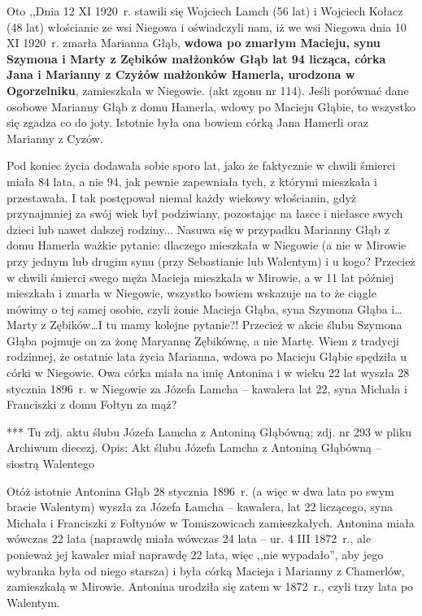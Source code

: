 Oto ,,Dnia 12 XI 1920~r. stawili się Wojciech Lamch (56 lat) i Wojciech Kołacz (48 lat) włościanie ze wsi Niegowa i oświadczyli nam, iż we wsi Niegowa dnia 10 XI 1920~r. zmarła Marianna Głąb, \textbf{wdowa po zmarłym Macieju, synu Szymona i Marty z Zębików małżonków Głąb lat 94 licząca, córka Jana i Marianny z Czyżów małżonków Hamerla, urodzona w Ogorzelniku}, zamieszkała w Niegowie. (akt zgonu nr 114). Jeśli porównać dane osobowe Marianny Głąb z domu Hamerla, wdowy po Macieju Głąbie, to wszystko się zgadza co do joty. Istotnie była ona bowiem córką Jana Hamerli oraz Marianny z Cyzów.

Pod koniec życia dodawała sobie sporo lat, jako że faktycznie w chwili śmierci miała 84 lata, a nie 94, jak pewnie zapewniała tych, z którymi mieszkała i przestawała. I tak postępował niemal każdy wiekowy włościanin, gdyż przynajmniej za swój wiek był podziwiany, pozostając na łasce i niełasce swych dzieci lub nawet dalszej rodziny... Nasuwa się w przypadku Marianny Głąb z domu Hamerla ważkie pytanie: dlaczego mieszkała w Niegowie (a nie w Mirowie przy jednym lub drugim synu (przy Sebastianie lub Walentym) i u kogo? Przecież w chwili śmierci swego męża Macieja mieszkała w Mirowie, a w 11 lat później mieszkała i zmarła w Niegowie, wszystko bowiem wskazuje na to że ciągle mówimy o tej samej osobie, czyli żonie Macieja Głąba, syna Szymona Głąba i\ldots Marty z Zębików\ldots I tu mamy kolejne pytanie?! Przecież w akcie ślubu Szymona Głąba pojmuje on za żonę Maryannę Zębikównę, a nie Martę. Wiem z tradycji rodzinnej, że ostatnie lata życia Marianna, wdowa po Macieju Głąbie spędziła u córki w Niegowie. Owa córka miała na imię Antonina i w wieku 22 lat wyszła 28 stycznia 1896~r. w Niegowie za Józefa Lamcha -- kawalera lat 22, syna Michała i Franciszki z domu Fołtyn za mąż?

{\color{red}
*** Tu zdj. aktu ślubu Józefa Lamcha z Antoniną Głąbówną; zdj. nr 293 w pliku Archiwum diecezj.
Opis: Akt ślubu Józefa Lamcha z Antoniną Głąbówną -- siostrą Walentego }

Otóż istotnie Antonina Głąb 28 stycznia 1896~r. (a więc w dwa lata po swym bracie Walentym) wyszła za Józefa Lamcha – kawalera, lat 22 liczącego, syna Michała i Franciszki z Fołtynów w Tomiszowicach zamieszkałych. Antonina miała wówczas 22 lata (naprawdę miała wówczas 24 lata -- ur. 4 III 1872~r., ale ponieważ jej kawaler miał naprawdę 22 lata, więc ,,nie wypadało'', aby jego wybranka była od niego starsza) i była córką Macieja i Marianny z Chamerlów, zamieszkałą w Mirowie. Antonina urodziła się zatem w 1872~r., czyli trzy lata po Walentym.

